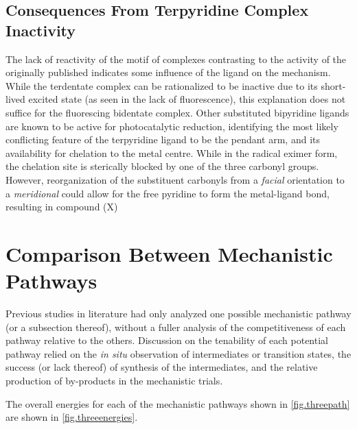 \FloatBarrier

\subsection{Consequences From \texorpdfstring{}{Bidentate} Terpyridine Complex Inactivity}

The lack of reactivity of the  motif of complexes contrasting to the activity of the originally published  indicates some influence of the ligand on the mechanism. While the terdentate complex can be rationalized to be inactive due to its short-lived excited state (as seen in the lack of fluorescence), this explanation does not suffice for the fluorescing bidentate complex. Other substituted bipyridine ligands are known to be active for photocatalytic reduction, identifying the most likely conflicting feature of the terpyridine ligand to be the pendant arm, and its availability for chelation to the metal centre. While in the radical eximer form, the chelation site is sterically blocked by one of the three carbonyl groups. However, reorganization of the substituent carbonyls from a \textit{facial} orientation to a \textit{meridional} could allow for the free pyridine to form the metal-ligand bond, resulting in compound (X)



\section{Comparison Between Mechanistic Pathways} \label{sec.compare}

Previous studies in literature had only analyzed one possible mechanistic pathway (or a subsection thereof), without a fuller analysis of the competitiveness of each pathway relative to the others. Discussion on the tenability of each potential pathway relied on the \textit{in situ} observation of intermediates or transition states, the success (or lack thereof) of synthesis of the intermediates, and the relative production of by-products in the mechanistic trials.

The overall energies for each of the mechanistic pathways shown in \autoref{fig.threepath} are shown in \autoref{fig.threeenergies}. 

